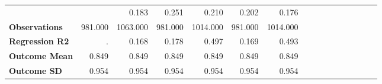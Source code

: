\begin{tabular}{@{\extracolsep{5pt}}lrrrrrrrrrrrrrrr}
{\bf } & \phantom{***} & 0.183\phantom{\phantom{)}***} & 0.251\phantom{\phantom{)}***} & 0.210\phantom{\phantom{)}***} & 0.202\phantom{\phantom{)}***} & 0.176\phantom{\phantom{)}***} \\
{\bf Observations} & 981.000\phantom{\phantom{)}***} & 1063.000\phantom{\phantom{)}***} & 981.000\phantom{\phantom{)}***} & 1014.000\phantom{\phantom{)}***} & 981.000\phantom{\phantom{)}***} & 1014.000\phantom{\phantom{)}***} \\
{\bf Regression R2} & .\phantom{***} & 0.168\phantom{***} & 0.178\phantom{***} & 0.497\phantom{***} & 0.169\phantom{***} & 0.493\phantom{***} \\
{\bf Outcome Mean} & 0.849\phantom{***} & 0.849\phantom{***} & 0.849\phantom{***} & 0.849\phantom{***} & 0.849\phantom{***} & 0.849\phantom{***} \\
{\bf Outcome SD} & 0.954\phantom{***} & 0.954\phantom{***} & 0.954\phantom{***} & 0.954\phantom{***} & 0.954\phantom{***} & 0.954\phantom{***} \\
\hline
\end{tabular}
